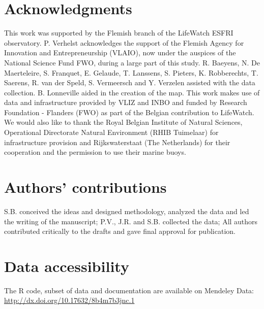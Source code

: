 \documentclass[preprint,12pt,authoryear]{elsarticle}
\newcommand{\ackname}{Acknowledgments}
\newcommand{\autcont}{Authors’ contributions}
\newcommand{\datacc}{Data accessibility}
\begin{document}
\begin{spacing}{1.9}
\section*{\ackname}

This work was supported by the Flemish branch of the LifeWatch ESFRI observatory. P. Verhelst acknowledges the support of the Flemish Agency for Innovation and
Entrepreneurship (VLAIO), now under the auspices of the National Science Fund FWO, during a large part of this study. R. Baeyens, N. De Maerteleire, S. Franquet, E. Gelaude, T. Lanssens, S. Pieters, K. Robberechts, T. Saerens, R. van der Speld, S. Vermeersch and Y. Verzelen assisted with the data collection. B. Lonneville aided in the creation of the map. This work makes use of data and infrastructure provided by VLIZ and INBO and funded by Research Foundation - Flanders (FWO) as part of the Belgian contribution to LifeWatch. We would also like to thank the Royal Belgian Institute of Natural Sciences, Operational Directorate Natural Environment (RHIB Tuimelaar) for infrastructure provision and Rijkswaterstaat (The Netherlands) for their cooperation and the permission to use their marine buoys.

\section*{\autcont}

S.B. conceived the ideas and designed methodology, analyzed the data and led the writing of the manuscript; P.V., J.R. and S.B. collected the data; All authors contributed critically to the drafts and gave final approval for publication.

\section*{\datacc}

The R code, subset of data and documentation are available on Mendeley Data: \url{http://dx.doi.org/10.17632/8b4m7b3jnc.1}

\newpage




\newpage
\FloatBarrier


\end{spacing}
\end{document}
